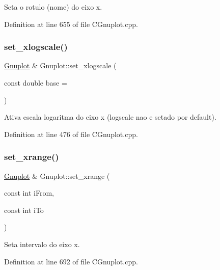 Seta o rotulo (nome) do eixo x. 



Definition at line 655 of file C\+Gnuplot.\+cpp.

\mbox{\label{class_gnuplot_aff546fad227d93babeb5d2cc9f047b89}} 
\subsubsection{\texorpdfstring{set\+\_\+xlogscale()}{set\_xlogscale()}}
{\footnotesize\ttfamily \hyperlink{class_gnuplot}{Gnuplot} \& Gnuplot\+::set\+\_\+xlogscale (\begin{DoxyParamCaption}\item[{const double}]{base = {} }\end{DoxyParamCaption})}



Ativa escala logaritma do eixo x (logscale nao e setado por default). 



Definition at line 476 of file C\+Gnuplot.\+cpp.

\mbox{\label{class_gnuplot_a726232ac7226b9fc8811eaefa87c902b}} 
\subsubsection{\texorpdfstring{set\+\_\+xrange()}{set\_xrange()}}
{\footnotesize\ttfamily \hyperlink{class_gnuplot}{Gnuplot} \& Gnuplot\+::set\+\_\+xrange (\begin{DoxyParamCaption}\item[{const int}]{i\+From,  }\item[{const int}]{i\+To }\end{DoxyParamCaption})}



Seta intervalo do eixo x. 



Definition at line 692 of file C\+Gnuplot.\+cpp.

\mbox{\label{class_gnuplot_a3cc19dba32bb2d3ac59494ae1493faa7}} 
